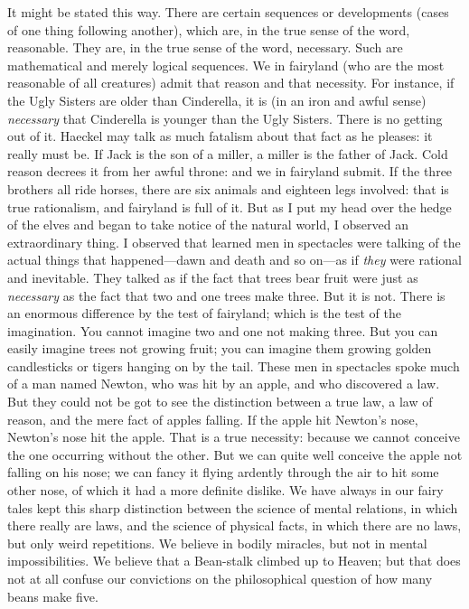 \documentclass{book}
\begin{document}
It might be stated this way. There are certain sequences or developments (cases of one thing following another), which are, in the true sense of the word, reasonable. They are, in the true sense of the word, necessary. Such are mathematical and merely logical sequences. We in fairyland (who are the most reasonable of all creatures) admit that reason and that necessity. For instance, if the Ugly Sisters are older than Cinderella, it is (in an iron and awful sense) \emph{necessary} that Cinderella is younger than the Ugly Sisters. There is no getting out of it. Haeckel may talk as much fatalism about that fact as he pleases: it really must be. If Jack is the son of a miller, a miller is the father of Jack. Cold reason decrees it from her awful throne: and we in fairyland submit. If the three brothers all ride horses, there are six animals and eighteen legs involved: that is true rationalism, and fairyland is full of it. But as I put my head over the hedge of the elves and began to take notice of the natural world, I observed an extraordinary thing. I observed that learned men in spectacles were talking of the actual things that happened—dawn and death and so on—as if \emph{they} were rational and inevitable. They talked as if the fact that trees bear fruit were just as \emph{necessary} as the fact that two and one trees make three. But it is not. There is an enormous difference by the test of fairyland; which is the test of the imagination. You cannot imagine two and one not making three. But you can easily imagine trees not growing fruit; you can imagine them growing golden candlesticks or tigers hanging on by the tail. These men in spectacles spoke much of a man named Newton, who was hit by an apple, and who discovered a law. But they could not be got to see the distinction between a true law, a law of reason, and the mere fact of apples falling. If the apple hit Newton’s nose, Newton’s nose hit the apple. That is a true necessity: because we cannot conceive the one occurring without the other. But we can quite well conceive the apple not falling on his nose; we can fancy it flying ardently through the air to hit some other nose, of which it had a more definite dislike. We have always in our fairy tales kept this sharp distinction between the science of mental relations, in which there really are laws, and the science of physical facts, in which there are no laws, but only weird repetitions. We believe in bodily miracles, but not in mental impossibilities. We believe that a Bean-stalk climbed up to Heaven; but that does not at all confuse our convictions on the philosophical question of how many beans make five.
\end{document}
